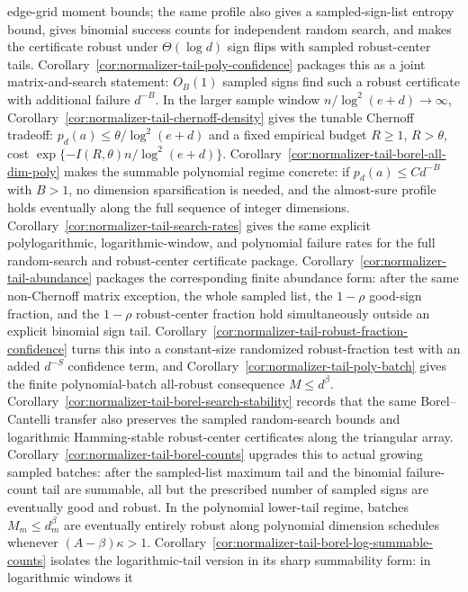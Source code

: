 \documentclass[11pt]{amsart}
\numberwithin{equation}{section}
\theoremstyle{definition}
\theoremstyle{remark}
\begin{document}
edge-grid moment bounds; the same profile also gives a sampled-sign-list
entropy bound, gives binomial success counts for independent random search, and makes the
certificate robust under \(\Theta(\log d)\) sign flips with sampled robust-center
tails.  Corollary~\ref{cor:normalizer-tail-poly-confidence} packages this as a
joint matrix-and-search statement: \(O_B(1)\) sampled signs find such a robust
certificate with additional failure \(d^{-B}\).  In the larger
sample window \(n/\log^2(e+d)\to\infty\),
Corollary~\ref{cor:normalizer-tail-chernoff-density} gives the tunable
Chernoff tradeoff: \(p_d(a)\le\theta/\log^2(e+d)\) and a fixed empirical budget
\(R\ge1\), \(R>\theta\), cost
\(\exp\{-I(R,\theta)n/\log^2(e+d)\}\).
Corollary~\ref{cor:normalizer-tail-borel-all-dim-poly} makes the summable
polynomial regime concrete: if \(p_d(a)\le Cd^{-B}\) with \(B>1\), no
dimension sparsification is needed, and the almost-sure profile holds eventually
along the full sequence of integer dimensions.
Corollary~\ref{cor:normalizer-tail-search-rates} gives the same explicit
polylogarithmic, logarithmic-window, and polynomial failure rates for the full
random-search and robust-center certificate package.
Corollary~\ref{cor:normalizer-tail-abundance} packages the corresponding finite
abundance form: after the same non-Chernoff matrix exception, the whole sampled
list, the \(1-\rho\) good-sign fraction, and the \(1-\rho\) robust-center
fraction hold simultaneously outside an explicit binomial sign tail.
Corollary~\ref{cor:normalizer-tail-robust-fraction-confidence} turns this into
a constant-size randomized robust-fraction test with an added \(d^{-S}\)
confidence term, and Corollary~\ref{cor:normalizer-tail-poly-batch} gives the
finite polynomial-batch all-robust consequence \(M\le d^\beta\).
Corollary~\ref{cor:normalizer-tail-borel-search-stability} records that the same
Borel--Cantelli transfer also preserves the sampled random-search bounds and
logarithmic Hamming-stable robust-center certificates along the triangular array.
Corollary~\ref{cor:normalizer-tail-borel-counts} upgrades this to actual growing
sampled batches: after the sampled-list maximum tail and the binomial
failure-count tail are summable, all but the prescribed number of sampled signs
are eventually good and robust.  In the polynomial lower-tail regime, batches
\(M_m\le d_m^\beta\) are eventually entirely robust along polynomial dimension
schedules whenever \((A-\beta)\kappa>1\).
Corollary~\ref{cor:normalizer-tail-borel-log-summable-counts} isolates the
logarithmic-tail version in its sharp summability form: in logarithmic windows it
\end{document}
